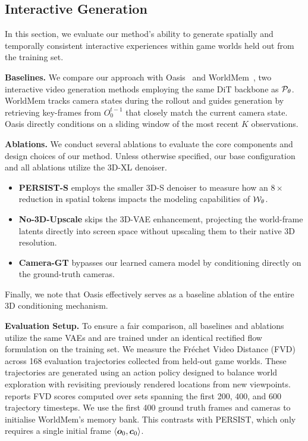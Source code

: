 \documentclass{article}
\theoremstyle{plain}
\theoremstyle{definition}
\theoremstyle{remark}
\begin{document}
\subsection{Interactive Generation}

In this section, we evaluate our method's ability to generate spatially and temporally consistent interactive experiences within game worlds held out from the training set.

\textbf{Baselines.} We compare our approach with Oasis~\citep{decart2024oasis} and WorldMem~\citep{xiao2025worldmemlongtermconsistentworld}, two interactive video generation methods employing the same DiT backbone as ${\mathcal{P}}_\theta$. WorldMem tracks camera states during the rollout and guides generation by retrieving key-frames from $O^{t-1}_0$ that closely match the current camera state. Oasis directly conditions on a sliding window of the most recent $K$ observations.

\textbf{Ablations.} We conduct several ablations to evaluate the core components and design choices of our method. Unless otherwise specified, our base configuration and all ablations utilize the 3D-XL denoiser.
\begin{itemize}[leftmargin=*,nosep]
\item \textbf{PERSIST-S} employs the smaller 3D-S denoiser to measure how an $8\times$ reduction in spatial tokens impacts the modeling capabilities of ${\mathcal{W}}_\theta$.
\item \textbf{No-3D-Upscale} skips the 3D-VAE enhancement, projecting the world-frame latents directly into screen space without upscaling them to their native 3D resolution.
\item \textbf{Camera-GT} bypasses our learned camera model by conditioning directly on the ground-truth cameras.
\end{itemize}
Finally, we note that Oasis effectively serves as a baseline ablation of the entire 3D conditioning mechanism.

\textbf{Evaluation Setup.} To ensure a fair comparison, all baselines and ablations utilize the same VAEs and are trained under an identical rectified flow formulation on the training set. We measure the Fréchet Video Distance (FVD)~\citep{unterthiner2018towards} across 168 evaluation trajectories collected from held-out game worlds. These trajectories are generated using an action policy designed to balance world exploration with revisiting previously rendered locations from new viewpoints.  reports FVD scores computed over sets spanning the first 200, 400, and 600 trajectory timesteps. We use the first 400 ground truth frames and cameras to initialise WorldMem's memory bank. This contrasts with PERSIST, which only requires a single initial frame $\langle {\bm{o}}_0, {\bm{c}}_0 \rangle$.
\end{document}
